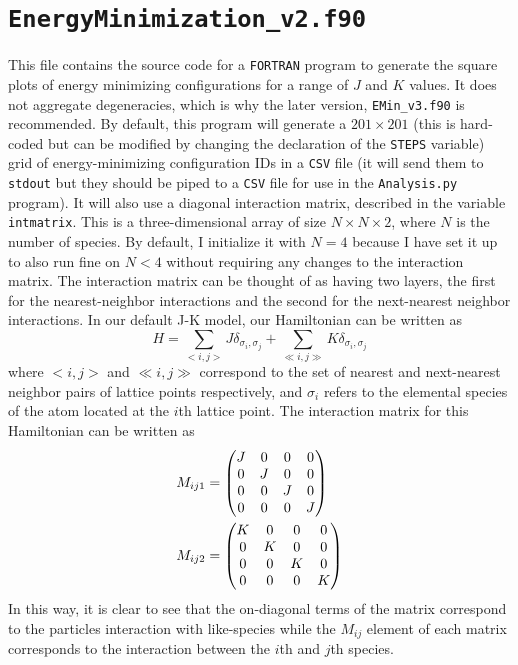 \documentclass[12pt]{article}
\begin{document}
\section{\texttt{EnergyMinimization\_v2.f90}}

This file contains the source code for a \texttt{FORTRAN} program to generate the square plots of energy minimizing configurations for a range of $ J $ and $ K $ values. It does not aggregate degeneracies, which is why the later version, \texttt{EMin\_v3.f90} is recommended. By default, this program will generate a $ 201 \times 201 $ (this is hard-coded but can be modified by changing the declaration of the \texttt{STEPS} variable) grid of energy-minimizing configuration IDs in a \texttt{CSV} file (it will send them to \texttt{stdout} but they should be piped to a \texttt{CSV} file for use in the \texttt{Analysis.py} program). It will also use a diagonal interaction matrix, described in the variable \texttt{intmatrix}. This is a three-dimensional array of size $ N \times N \times 2 $, where $ N $ is the number of species. By default, I initialize it with $ N=4 $ because I have set it up to also run fine on $ N<4 $ without requiring any changes to the interaction matrix. The interaction matrix can be thought of as having two layers, the first for the nearest-neighbor interactions and the second for the next-nearest neighbor interactions. In our default J-K model, our Hamiltonian can be written as
\begin{equation}
    H = \sum_{<i,j>} J \delta_{\sigma_i, \sigma_j} + \sum_{\ll i,j\gg} K \delta_{\sigma_i, \sigma_j}
\end{equation}
where $ <i,j> $ and $ \ll i,j \gg $ correspond to the set of nearest and next-nearest neighbor pairs of lattice points respectively, and $ \sigma_i $ refers to the elemental species of the atom located at the $ i $th lattice point. The interaction matrix for this Hamiltonian can be written as
\begin{align}
    M_{ij1} &= \mqty(\dmat[0]{J,J,J,J}) \\
    M_{ij2} &= \mqty(\dmat[0]{K,K,K,K})
\end{align}
In this way, it is clear to see that the on-diagonal terms of the matrix correspond to the particles interaction with like-species while the $ M_{ij} $ element of each matrix corresponds to the interaction between the $ i $th and $ j $th species.
\end{document}
